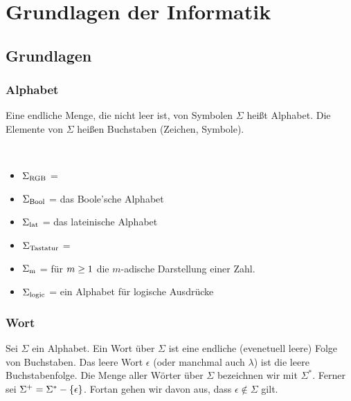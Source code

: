 \part{Grundlagen der Informatik}
\chapter{Grundlagen}
\section{Alphabet}
\begin{definition}[Alphabet]
Eine endliche Menge, die nicht leer ist, von Symbolen $\Sigma$ heißt Alphabet. Die Elemente von $\Sigma$ heißen Buchstaben (Zeichen, Symbole).
\end{definition}

\begin{example}~
\begin{itemize}
\item $\Sigma_{\text{RGB}}$ = 
\item $\Sigma_{\text{Bool}}$ =  das Boole'sche Alphabet
\item $\Sigma_{\text{lat}}$ =  das lateinische Alphabet
\item $\Sigma_{\text{Tastatur}}$ = 
\item $\Sigma_{\text{m}}$ =   für $m \geq 1$ die $m$-adische Darstellung einer Zahl.
\item $\Sigma_{\text{logic}}$ =  ein Alphabet für logische Ausdrücke
\end{itemize}
\end{example}

\section{Wort}
\begin{definition}[Wort]
Sei $\Sigma$ ein Alphabet. Ein Wort über $\Sigma$ ist eine endliche (evenetuell leere) Folge von Buchstaben. Das leere Wort $\epsilon$ (oder manchmal auch $\lambda$) ist die leere Buchstabenfolge. Die Menge aller Wörter über $\Sigma$ bezeichnen wir mit $\Sigma^*$. Ferner sei $\Sigma^+ = \Sigma^* - \left\{\epsilon\right\}$. Fortan gehen wir davon aus, dass $\epsilon \notin \Sigma$ gilt.
\end{definition}

